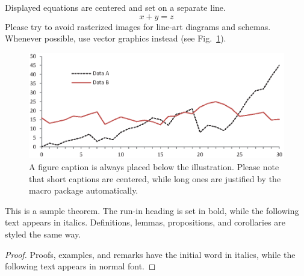 \noindent Displayed equations are centered and set on a separate
line.
\begin{equation}
x + y = z
\end{equation}
Please try to avoid rasterized images for line-art diagrams and
schemas. Whenever possible, use vector graphics instead (see
Fig.~\ref{fig1}).

\begin{figure}
\includegraphics[width=\textwidth]{fig1.eps}
\caption{A figure caption is always placed below the illustration.
Please note that short captions are centered, while long ones are
justified by the macro package automatically.} \label{fig1}
\end{figure}

\begin{theorem}
This is a sample theorem. The run-in heading is set in bold, while
the following text appears in italics. Definitions, lemmas,
propositions, and corollaries are styled the same way.
\end{theorem}
%
%
\begin{proof}
Proofs, examples, and remarks have the initial word in italics,
while the following text appears in normal font.
\end{proof}